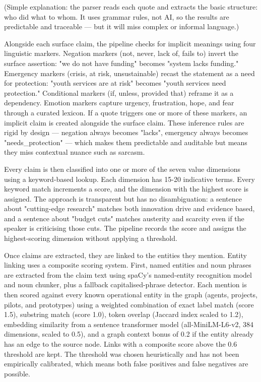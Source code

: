 \documentclass[11pt,a4paper]{article}
\begin{document}
(Simple explanation: the parser reads each quote and extracts the basic
structure: who did what to whom. It uses grammar rules, not AI, so the
results are predictable and traceable — but it will miss complex or
informal language.)

Alongside each surface claim, the pipeline checks for implicit meanings
using four linguistic markers. Negation markers (not, never, lack of,
fails to) invert the surface assertion: "we do not have funding" becomes
"system lacks funding." Emergency markers (crisis, at risk,
unsustainable) recast the statement as a need for protection: "youth
services are at risk" becomes "youth services need protection."
Conditional markers (if, unless, provided that) reframe it as a
dependency. Emotion markers capture urgency, frustration, hope, and fear
through a curated lexicon. If a quote triggers one or more of these
markers, an implicit claim is created alongside the surface claim. These
inference rules are rigid by design — negation always becomes "lacks",
emergency always becomes "needs\_protection" — which makes them
predictable and auditable but means they miss contextual nuance such as
sarcasm.

Every claim is then classified into one or more of the seven value
dimensions using a keyword-based lookup. Each dimension has 15-20
indicative terms. Every keyword match increments a score, and the
dimension with the highest score is assigned. The approach is
transparent but has no disambiguation: a sentence about "cutting-edge
research" matches both innovation drive and evidence based, and a
sentence about "budget cuts" matches austerity and scarcity even if the
speaker is criticising those cuts. The pipeline records the score and
assigns the highest-scoring dimension without applying a threshold.

Once claims are extracted, they are linked to the entities they mention.
Entity linking uses a composite scoring system. First, named entities
and noun phrases are extracted from the claim text using spaCy's
named-entity recognition model and noun chunker, plus a fallback
capitalised-phrase detector. Each mention is then scored against every
known operational entity in the graph (agents, projects, pilots, and
prototypes) using a weighted combination of exact label match (score
1.5), substring match (score 1.0), token overlap (Jaccard index scaled
to 1.2), embedding similarity from a sentence transformer model
(all-MiniLM-L6-v2, 384 dimensions, scaled to 0.5), and a graph context
bonus of 0.2 if the entity already has an edge to the source node. Links
with a composite score above the 0.6 threshold are kept. The threshold
was chosen heuristically and has not been empirically calibrated, which
means both false positives and false negatives are possible.
\end{document}
